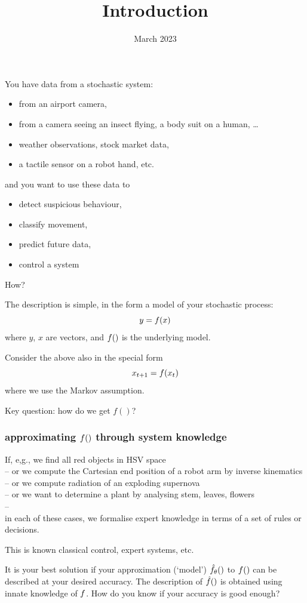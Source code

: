 \documentclass[USenglish,pdftex,compress,10pt,svgnamesi]{beamer}%
\title{Introduction}
\date{March 2023}
\begin{document}
\begin{frame}
	\titlepage
\end{frame}


\begin{frame}
You have data from a stochastic system:
\begin{itemize}
  \item from an airport camera,
  \item from a camera seeing an insect flying, a body suit on a human, \dots
  \item weather observations, stock market data,
  \item a tactile sensor on a robot hand, etc.
\end{itemize}
and you want to use these data to
\begin{itemize}
  \item detect suspicious behaviour,
  \item classify movement,
  \item predict future data,
  \item control a system
\end{itemize}
How?
\end{frame}






\begin{frame}
The description is simple, in the form a model of your stochastic process:
$$
y = f(x)
$$
where $y$, $x$ are vectors, and $f()$ is the underlying model.

Consider the above also in the special form
$$
x_{t+1} = f (x_t)
$$
where we use the Markov assumption.

Key question: how do we get $f()$?
\end{frame}



\begin{frame}
\frametitle{approximating $f()$ through system knowledge}
If, e,g., we find all red objects in HSV space\\
 -- or we compute the Cartesian end position of a robot arm by inverse kinematics\\
 -- or we compute radiation of an exploding supernova\\
 -- or we want to determine a plant by analysing stem, leaves, flowers\\
 --\\
in each of these cases, we formalise expert knowledge in terms of a set of rules or decisions.

This is known classical control, expert systems, etc.

It is your best solution if your approximation (`model') $\hat{f}_\theta()$ to $f()$ can be described at your desired accuracy.
The description of $\hat{f}()$ is obtained using innate knowledge of $f$.
How do you know if your accuracy is good enough?
\end{frame}
\end{document}
